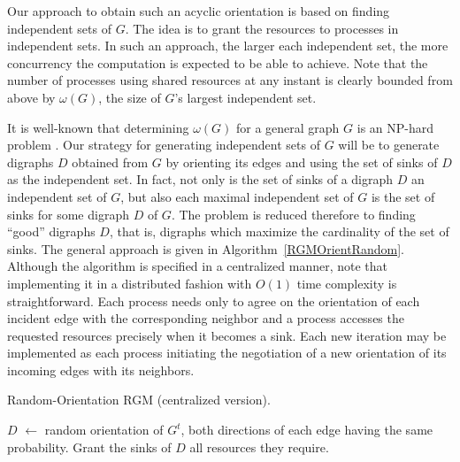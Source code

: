 \documentclass{article}
\begin{document}
Our approach to obtain such an acyclic orientation is based on finding
independent sets of $G$. The idea is to grant the resources to processes in
independent sets. In such an approach, the larger each independent set, the more
concurrency the computation is expected to be able to achieve. Note that the
number of processes using shared resources at any instant is clearly bounded
from above by $\omega(G)$, the size of $G$'s largest independent set. 

It is well-known that determining $\omega(G)$ for a general graph $G$ is an
NP-hard problem \cite{GareyJohnson}. Our strategy for generating independent
sets of $G$ will be to generate digraphs $D$ obtained from $G$ by orienting its
edges and using the set of sinks of $D$ as the independent set. In fact, not
only is the set of sinks of a digraph $D$ an independent set of $G$, but also
each maximal independent set of $G$ is the set of sinks for some digraph $D$ of
$G$. The problem is reduced therefore to finding ``good'' digraphs $D$, that is,
digraphs which maximize the cardinality of the set of sinks. The general
approach is given in Algorithm~\ref{RGMOrientRandom}. Although the algorithm is
specified in a centralized manner, note that implementing it in a distributed
fashion with $O(1)$ time complexity is straightforward. Each process needs only
to agree on the orientation of each incident edge with the corresponding
neighbor and a process accesses the requested resources precisely when it
becomes a sink. Each new iteration may be implemented as each process initiating
the negotiation of a new orientation of its incoming edges with its neighbors.

\begin{algorithm}[t]
	\caption{Random-Orientation RGM (centralized version).}
	\label{RGMOrientRandom}
	\begin{algorithmic}[1]
				\State $D$ $\gets$ random orientation of $G^t$, both directions of each edge having the same probability.
				\State Grant the sinks of $D$ all resources they require.
			\EndWhile
		\EndProcedure
	\end{algorithmic}
\end{algorithm}
\end{document}
